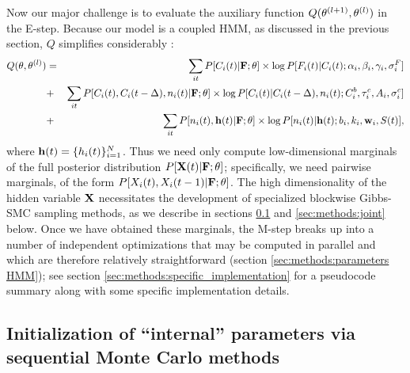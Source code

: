 Now our major challenge is to evaluate the auxiliary function
$Q(\mathbf{\theta}^{(l+1)},\mathbf{\theta}^{(l)})$ in the E-step.  Because our model is a
coupled HMM, as discussed in the previous section, $Q$ simplifies
considerably \cite{RAB89}:
\begin{eqnarray}
  Q(\bth,\bth^{(l)}) &=& \sum_{it} P[C_i(t) | \bF; \bth] \times \log
P[F_i(t)|C_i(t); \alpha_i, \beta_i, \gamma_i, \sigma^F_i] \nonumber \\
&+& \sum_{it} P[C_i(t), C_i(t-\Delta), n_i(t) | \bF; \bth] \times \log
P[C_i(t)|C_i(t-\Delta), n_i(t); C^b_i, \tau^c_i, A_i, \sigma^c_i]
\nonumber \\ &+& \sum_{it} P[n_i(t), \bh(t) | \bF; \bth] \times \log
P[n_i(t)| \bh(t); b_i, k_i, \bw_i, S(t)],
\label{eqn:loglik:definition-expl}
\end{eqnarray}
where $\mathbf{h}(t)=\{h_i(t)\}_{i=1}^N$.  Thus we need only compute
low-dimensional marginals of the full posterior distribution $P[{\bf X}(t)
| {\bf F}; \mathbf{\theta}]$; specifically, we need pairwise marginals, of the form
$P[X_i(t), X_i(t-1) | {\bf F}; \mathbf{\theta}]$.  The high dimensionality of the
hidden variable ${\bf X}$ necessitates the development of specialized
blockwise Gibbs-SMC sampling methods, as we describe in sections
\ref{sec:methods:indep} and \ref{sec:methods:joint} below.  Once we
have obtained these marginals, the M-step breaks up into a number of
independent optimizations that may be computed in parallel and which
are therefore relatively straightforward (section
\ref{sec:methods:parameters HMM}); see section
\ref{sec:methods:specific_implementation} for a pseudocode summary
along with some specific implementation details.

\subsection{Initialization of ``internal'' parameters via sequential
  Monte Carlo methods}
\label{sec:methods:indep}

